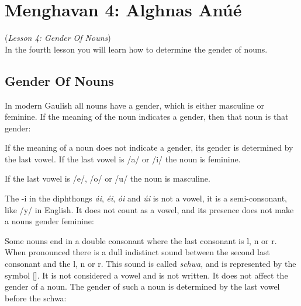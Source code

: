 \section{Menghavan 4: Alghnas An\'{u}\'{e}}
(\textit{Lesson 4: Gender Of Nouns})\\

In the fourth lesson you will learn how to determine the gender of nouns.

\subsection{Gender Of Nouns}

In modern Gaulish all nouns have a gender, which is either masculine or feminine. If the meaning of the noun indicates a gender, then that noun is that gender:

If the meaning of a noun does not indicate a gender, its gender is determined by the last vowel. If the last vowel is /a/ or /i/ the noun is feminine.

If the last vowel is /e/, /o/ or /u/ the noun is masculine.

The -i in the diphthongs \textit{\'{a}i}, \textit{\'{e}i}, \textit{\'{o}i} and \textit{\'{u}i} is not a vowel, it is a semi-consonant, like /y/ in English. It does not count as a vowel, and its presence does not make a nouns gender feminine:

Some nouns end in a double consonant where the last consonant is l, n or r. When pronounced there is a dull indistinct sound between the second last consonant and the l, n or r. This sound is called \textit{schwa}, and is represented by the symbol $[$\textschwa$]$. It is not considered a vowel and is not written. It does not affect the gender of a noun. The gender of such a noun is determined by the last vowel before the schwa:

